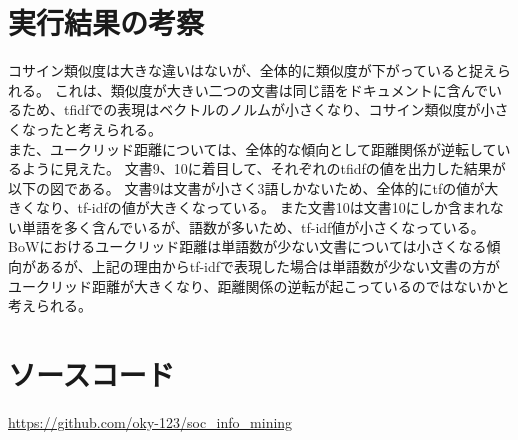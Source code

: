 \documentclass{jsarticle}
\begin{document}
\section{実行結果の考察}

コサイン類似度は大きな違いはないが、全体的に類似度が下がっていると捉えられる。
これは、類似度が大きい二つの文書は同じ語をドキュメントに含んでいるため、tfidfでの表現はベクトルのノルムが小さくなり、コサイン類似度が小さくなったと考えられる。\\
また、ユークリッド距離については、全体的な傾向として距離関係が逆転しているように見えた。
文書9、10に着目して、それぞれのtfidfの値を出力した結果が以下の図である。
文書9は文書が小さく3語しかないため、全体的にtfの値が大きくなり、tf-idfの値が大きくなっている。
また文書10は文書10にしか含まれない単語を多く含んでいるが、語数が多いため、tf-idf値が小さくなっている。
BoWにおけるユークリッド距離は単語数が少ない文書については小さくなる傾向があるが、上記の理由からtf-idfで表現した場合は単語数が少ない文書の方がユークリッド距離が大きくなり、距離関係の逆転が起こっているのではないかと考えられる。

\section{ソースコード}
\url{https://github.com/oky-123/soc_info_mining}
\end{document}
